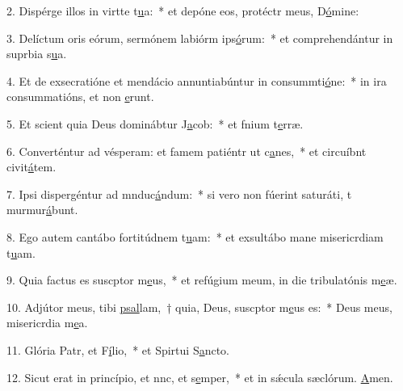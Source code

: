 2. Dispérge illos in virtte t\uline{u}a:~* et depóne eos, protéctr meus, D\uline{ó}mine:\par 
3. Delíctum oris eórum, sermónem labiórm ips\uline{ó}rum:~* et comprehendántur in suprbia s\uline{u}a.\par 
4. Et de exsecratióne et mendácio annuntiabúntur in consummti\uline{ó}ne:~* in ira consummatións, et non \uline{e}runt.\par 
5. Et scient quia Deus dominábtur J\uline{a}cob:~* et fnium t\uline{e}rræ.\par 
6. Converténtur ad vésperam: et famem patiéntr ut c\uline{a}nes,~* et circuíbnt civit\uline{á}tem.\par 
7. Ipsi dispergéntur ad mnduc\uline{á}ndum:~* si vero non fúerint saturáti, t murmur\uline{á}bunt.\par 
8. Ego autem cantábo fortitúdnem t\uline{u}am:~* et exsultábo mane misericrdiam t\uline{u}am.\par 
9. Quia factus es suscptor m\uline{e}us,~* et refúgium meum, in die tribulatónis m\uline{e}æ.\par 
10. Adjútor meus, tibi \uline{psal}lam,~† quia, Deus, suscptor m\uline{e}us es:~* Deus meus, misericrdia m\uline{e}a.\par 
11. Glória Patr, et F\uline{í}lio,~* et Spirtui S\uline{a}ncto.\par 
12. Sicut erat in princípio, et nnc, et s\uline{e}mper,~* et in sǽcula sæclórum. \uline{A}men.\par 
